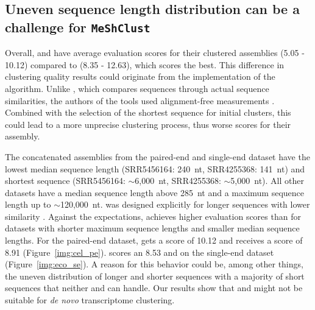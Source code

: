 \documentclass[12pt,a4paper,english]{article}
\begin{document}
	\subsection{Uneven sequence length distribution can be a challenge for \texttt{MeShClust}}
		Overall, \mclust and \mclusttwo have average evaluation scores for their clustered assemblies (5.05 - 10.12) compared to \cdhit (8.35 - 12.63), which scores the best. This difference in clustering quality results could originate from the implementation of the \mclust algorithm. Unlike \cdhit, which compares sequences through actual sequence similarities, the authors of the tools used alignment-free measurements \citep{meshclust:18}. Combined with the selection of the shortest sequence for initial clusters, this could lead to a more unprecise clustering process, thus worse scores for their assembly.
    
	
	    The concatenated assemblies from the paired-end \celegans and single-end \ecoli dataset have the lowest median sequence length (SRR5456164: 240~nt, SRR4255368: 141~nt) and shortest sequence (SRR5456164: $\sim$6,000~nt, SRR4255368: $\sim$5,000~nt). All other datasets have a median sequence length above 285~nt and a maximum sequence length up to $\sim$120,000~nt.
		\mclusttwo was designed explicitly for longer sequences with lower similarity \citep{meshclust2:18}. Against the expectations, \mclusttwo achieves higher evaluation scores than \mclust for datasets with shorter maximum sequence lengths and smaller median sequence lengths.
		For the paired-end \celegans dataset, \mclusttwo gets a score of 10.12 and \mclust receives a score of 8.91 (Figure~\ref{img:cel_pe}). \mclusttwo scores an 8.53 and  on the single-end \ecoli dataset (Figure~\ref{img:eco_se}).
		A reason for this behavior could be, among other things, the uneven distribution of longer and shorter sequences with a majority of short sequences that neither \mclust and \mclusttwo can handle.
		Our results show that \mclust and \mclusttwo might not be suitable for \textit{de novo} transcriptome clustering.
	
\end{document}
